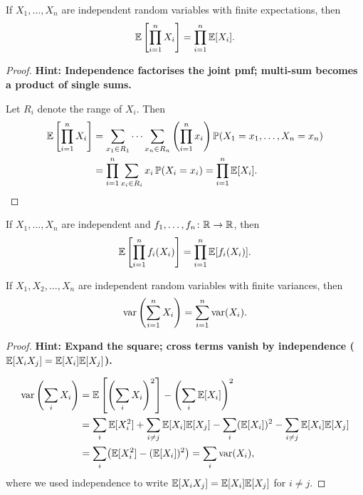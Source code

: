 \documentclass[a4paper]{article}
\begin{document}
\begin{thm}
  If $X_1, \dotsc, X_n$ are independent random variables with finite expectations, then
  \[
    \mathbb{E}\left[\prod_{i=1}^{n} X_i\right] = \prod_{i=1}^{n} \mathbb{E}[X_i].
  \]
\end{thm}

\begin{proof}
  \textbf{Hint: Independence factorises the joint pmf; multi-sum becomes a product of single sums.}

  Let $R_i$ denote the range of $X_i$. Then
  \begin{align*}
    \mathbb{E}\left[\prod_{i=1}^n X_i\right] &= \sum_{x_1\in R_1}\cdots \sum_{x_n\in R_n}\left(\prod_{i=1}^{n} x_i\right) \mathbb{P}(X_1 = x_1, \dotsc, X_n = x_n)\\
    &= \prod_{i = 1}^n \sum_{x_i \in R_i}x_i\,\mathbb{P}(X_i = x_i) = \prod_{i = 1}^n \mathbb{E}[X_i].\qedhere
  \end{align*}
\end{proof}

\begin{cor}
  If $X_1,\dotsc, X_n$ are independent and $f_1, \dotsc, f_n\colon \mathbb{R}\to \mathbb{R}$, then
  \[
    \mathbb{E}\left[\prod_{i=1}^{n} f_i(X_i)\right] = \prod_{i=1}^{n} \mathbb{E}[f_i(X_i)].
  \]
\end{cor}

\begin{thm}
  If $X_1, X_2, \dotsc, X_n$ are independent random variables with finite variances, then
  \[
    \operatorname{var}\left(\sum_{i=1}^{n} X_i\right) = \sum_{i=1}^{n} \operatorname{var} (X_i).
  \]
\end{thm}

\begin{proof}
  \textbf{Hint: Expand the square; cross terms vanish by independence ($\mathbb{E}[X_i X_j] = \mathbb{E}[X_i]\mathbb{E}[X_j]$).}

  \begin{align*}
    \operatorname{var}\left(\sum_i X_i\right) &= \mathbb{E}\left[\left(\sum_i X_i\right)^2\right] - \left(\sum_i\mathbb{E}[X_i]\right)^2\\
    &= \sum_i \mathbb{E}[X_i^2] + \sum_{i\neq j}\mathbb{E}[X_i]\mathbb{E}[X_j] - \sum_i(\mathbb{E}[X_i])^2 - \sum_{i\neq j}\mathbb{E}[X_i]\mathbb{E}[X_j]\\
    &= \sum_i \bigl(\mathbb{E}[X_i^2] - (\mathbb{E}[X_i])^2\bigr) = \sum_i \operatorname{var}(X_i),
  \end{align*}
  where we used independence to write $\mathbb{E}[X_i X_j] = \mathbb{E}[X_i]\mathbb{E}[X_j]$ for $i \neq j$.
\end{proof}
\end{document}
